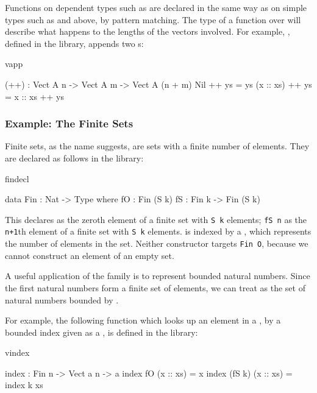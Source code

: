 Functions on dependent types such as  are declared in the same way
as on simple types such as  and  above, by pattern matching.
The type of a function over  will describe what happens to the
lengths of the vectors involved. For example, \tFN{++}, defined in the
library, appends two s:

\begin{SaveVerbatim}{vapp}

(++) : Vect A n -> Vect A m -> Vect A (n + m)
Nil       ++ ys = ys
(x :: xs) ++ ys = x :: xs ++ ys

\end{SaveVerbatim}

\subsubsection*{Example: The Finite Sets}

Finite sets, as the name suggests, are sets with a finite number of elements.
They are declared as follows in the library:

\begin{SaveVerbatim}{findecl}

data Fin : Nat -> Type where
   fO : Fin (S k)
   fS : Fin k -> Fin (S k)

\end{SaveVerbatim}

\noindent
This declares
 as the zeroth element of a finite set with \texttt{S k} elements; 
\texttt{fS n} as the
\texttt{n+1}th element of a finite set with \texttt{S k} elements. 
 is indexed by a , which
represents the number of elements in the set. 
Neither constructor targets \texttt{Fin O}, because we cannot construct an
element of an empty set.

A useful application of the  family is to represent bounded
natural numbers. Since the first  natural numbers form a finite
set of  elements, we can treat  as the set of natural
numbers bounded by . 

For example, the following function which looks up an element in a ,
by a bounded index given as a , is defined in the library:

\begin{SaveVerbatim}{vindex}

index : Fin n -> Vect a n -> a
index fO     (x :: xs) = x
index (fS k) (x :: xs) = index k xs

\end{SaveVerbatim}

